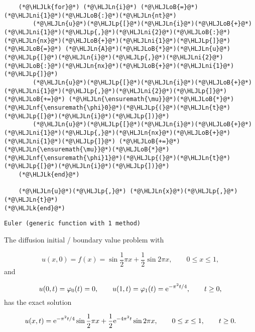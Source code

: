 \documentclass[12pt,a4paper]{article}
\newcommand{\HLJLk}[1]{\textcolor[RGB]{148,91,176}{\textbf{#1}}}
\newcommand{\HLJLn}[1]{#1}
\newcommand{\HLJLnf}[1]{\textcolor[RGB]{66,102,213}{#1}}
\newcommand{\HLJLni}[1]{\textcolor[RGB]{59,151,46}{#1}}
\newcommand{\HLJLoB}[1]{\textcolor[RGB]{102,102,102}{\textbf{#1}}}
\newcommand{\HLJLp}[1]{#1}
\begin{document}
\begin{lstlisting}
    (*@\HLJLk{for}@*) (*@\HLJLn{i}@*) (*@\HLJLoB{=}@*) (*@\HLJLni{1}@*)(*@\HLJLoB{:}@*)(*@\HLJLn{nt}@*)
        (*@\HLJLn{u}@*)(*@\HLJLp{[}@*)(*@\HLJLn{i}@*)(*@\HLJLoB{+}@*)(*@\HLJLni{1}@*)(*@\HLJLp{,}@*)(*@\HLJLni{2}@*)(*@\HLJLoB{:}@*)(*@\HLJLn{nx}@*)(*@\HLJLoB{+}@*)(*@\HLJLni{1}@*)(*@\HLJLp{]}@*) (*@\HLJLoB{=}@*) (*@\HLJLn{A}@*)(*@\HLJLoB{*}@*)(*@\HLJLn{u}@*)(*@\HLJLp{[}@*)(*@\HLJLn{i}@*)(*@\HLJLp{,}@*)(*@\HLJLni{2}@*)(*@\HLJLoB{:}@*)(*@\HLJLn{nx}@*)(*@\HLJLoB{+}@*)(*@\HLJLni{1}@*)(*@\HLJLp{]}@*) 
        (*@\HLJLn{u}@*)(*@\HLJLp{[}@*)(*@\HLJLn{i}@*)(*@\HLJLoB{+}@*)(*@\HLJLni{1}@*)(*@\HLJLp{,}@*)(*@\HLJLni{2}@*)(*@\HLJLp{]}@*) (*@\HLJLoB{+=}@*) (*@\HLJLn{\ensuremath{\mu}}@*)(*@\HLJLoB{*}@*)(*@\HLJLnf{\ensuremath{\phi}0}@*)(*@\HLJLp{(}@*)(*@\HLJLn{t}@*)(*@\HLJLp{[}@*)(*@\HLJLn{i}@*)(*@\HLJLp{])}@*)
        (*@\HLJLn{u}@*)(*@\HLJLp{[}@*)(*@\HLJLn{i}@*)(*@\HLJLoB{+}@*)(*@\HLJLni{1}@*)(*@\HLJLp{,}@*)(*@\HLJLn{nx}@*)(*@\HLJLoB{+}@*)(*@\HLJLni{1}@*)(*@\HLJLp{]}@*) (*@\HLJLoB{+=}@*) (*@\HLJLn{\ensuremath{\mu}}@*)(*@\HLJLoB{*}@*)(*@\HLJLnf{\ensuremath{\phi}1}@*)(*@\HLJLp{(}@*)(*@\HLJLn{t}@*)(*@\HLJLp{[}@*)(*@\HLJLn{i}@*)(*@\HLJLp{])}@*)
    (*@\HLJLk{end}@*)
    
    (*@\HLJLn{u}@*)(*@\HLJLp{,}@*) (*@\HLJLn{x}@*)(*@\HLJLp{,}@*) (*@\HLJLn{t}@*)
(*@\HLJLk{end}@*)
\end{lstlisting}

\begin{lstlisting}
Euler (generic function with 1 method)
\end{lstlisting}


The diffusion initial / boundary value problem with 

\[
u(x,0) = f(x) = \sin \frac{1}{2}\pi x + \frac{1}{2}\sin 2\pi x, \qquad 0 \leq x \leq 1, 
\]
and

\[
u(0,t) = \varphi_0(t) = 0, \qquad  u(1,t) = \varphi_1(t) = {\rm e}^{-\pi^2 t/4}, \qquad t \geq 0,
\]
has the exact solution

\[
u(x,t) = {\rm e}^{-\pi^2 t/4}\sin \frac{1}{2}\pi x + \frac{1}{2}{\rm e}^{-4\pi^2 t}\sin 2\pi x, \qquad 0 \leq x \leq 1, \qquad t \geq 0.
\]
\end{document}
